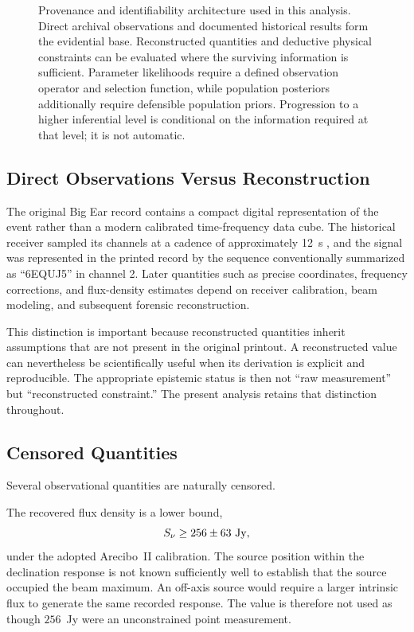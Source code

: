 \documentclass[twocolumn]{aastex701}
\newcommand{\snu}{S_\nu}
\begin{document}
\begin{figure}[ht!]
\caption{Provenance and identifiability architecture used in this analysis. Direct archival observations and documented historical results form the evidential base. Reconstructed quantities and deductive physical constraints can be evaluated where the surviving information is sufficient. Parameter likelihoods require a defined observation operator and selection function, while population posteriors additionally require defensible population priors. Progression to a higher inferential level is conditional on the information required at that level; it is not automatic.}
\label{fig:architecture}
\end{figure}

\subsection{Direct Observations Versus Reconstruction}

The original Big Ear record contains a compact digital representation of the event rather than a modern calibrated time-frequency data cube. The historical receiver sampled its channels at a cadence of approximately 12~s \citep{mendez2024}, and the signal was represented in the printed record by the sequence conventionally summarized as ``6EQUJ5'' in channel 2. Later quantities such as precise coordinates, frequency corrections, and flux-density estimates depend on receiver calibration, beam modeling, and subsequent forensic reconstruction.

This distinction is important because reconstructed quantities inherit assumptions that are not present in the original printout. A reconstructed value can nevertheless be scientifically useful when its derivation is explicit and reproducible. The appropriate epistemic status is then not ``raw measurement'' but ``reconstructed constraint.'' The present analysis retains that distinction throughout.

\subsection{Censored Quantities}

Several observational quantities are naturally censored.

The recovered flux density is a lower bound,
\[
\snu\geq256\pm63~{\rm Jy},
\]
under the adopted Arecibo~II calibration. The source position within the declination response is not known sufficiently well to establish that the source occupied the beam maximum. An off-axis source would require a larger intrinsic flux to generate the same recorded response. The value is therefore not used as though $256$~Jy were an unconstrained point measurement.
\end{document}
